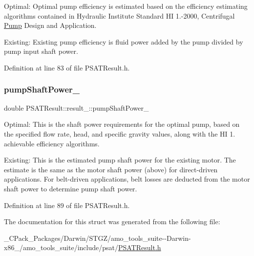 Optimal\+: Optimal pump efficiency is estimated based on the efficiency estimating algorithms contained in Hydraulic Institute Standard HI 1.-\/2000, Centrifugal \hyperlink{class_pump}{Pump} Design and Application. 

Existing\+: Existing pump efficiency is fluid power added by the pump divided by pump input shaft power. 

Definition at line 83 of file P\+S\+A\+T\+Result.\+h.

\mbox{\label{struct_p_s_a_t_result_1_1result___a825e4641aa3bac34b72a9494a3d623e3}} 
\subsubsection{\texorpdfstring{pump\+Shaft\+Power\+\_\+}{pumpShaftPower\_}}
{\footnotesize\ttfamily double P\+S\+A\+T\+Result\+::result\+\_\+\+::pump\+Shaft\+Power\+\_\+}



Optimal\+: This is the shaft power requirements for the optimal pump, based on the specified flow rate, head, and specific gravity values, along with the HI 1. achievable efficiency algorithms. 

Existing\+: This is the estimated pump shaft power for the existing motor. The estimate is the same as the motor shaft power (above) for direct-\/driven applications. For belt-\/driven applications, belt losses are deducted from the motor shaft power to determine pump shaft power. 

Definition at line 89 of file P\+S\+A\+T\+Result.\+h.



The documentation for this struct was generated from the following file\+:\begin{DoxyCompactItemize}
\item 
\+\_\+\+C\+Pack\+\_\+\+Packages/\+Darwin/\+S\+T\+G\+Z/amo\+\_\+tools\+\_\+suite-\/-\/\+Darwin-\/x86\+\_/amo\+\_\+tools\+\_\+suite/include/psat/\hyperlink{___c_pack___packages_2_darwin_2_s_t_g_z_2amo__tools__suite--_darwin-x86__64_2amo__tools__suite_2ebff217b422cb1d0ff6d2d9bd9f6ea65}{P\+S\+A\+T\+Result.\+h}\end{DoxyCompactItemize}
